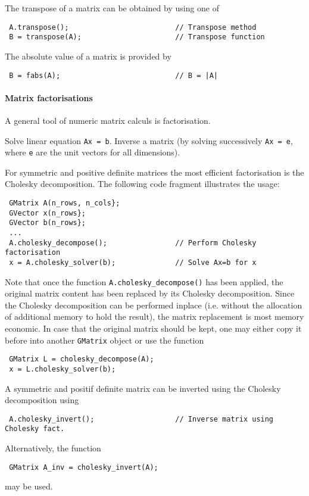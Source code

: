 \documentclass{article}[12pt,a4]
\begin{document}
The transpose of a matrix can be obtained by using one of
\begin{verbatim}
 A.transpose();                         // Transpose method
 B = transpose(A);                      // Transpose function
\end{verbatim}

The absolute value of a matrix is provided by
\begin{verbatim}
 B = fabs(A);                           // B = |A|
\end{verbatim}


\paragraph{Matrix factorisations}

A general tool of numeric matrix calculs is factorisation.

Solve linear equation {\tt Ax = b}.
Inverse a matrix (by solving successively {\tt Ax = e}, where {\tt e} 
are the unit vectors for all dimensions).

For symmetric and positive definite matrices the most efficient 
factorisation is the Cholesky decomposition.
The following code fragment illustrates the usage:
\begin{verbatim}
 GMatrix A(n_rows, n_cols};
 GVector x(n_rows};
 GVector b(n_rows};
 ...
 A.cholesky_decompose();                // Perform Cholesky factorisation
 x = A.cholesky_solver(b);              // Solve Ax=b for x
\end{verbatim}
Note that once the function {\tt A.cholesky\_decompose()} has been 
applied, the original matrix content has been replaced by its Cholesky 
decomposition.
Since the Cholesky decomposition can be performed inplace (i.e. 
without the allocation of additional memory to hold the result), the 
matrix replacement is most memory economic.
In case that the original matrix should be kept, one may either copy 
it before into another {\tt GMatrix} object or use the function
\begin{verbatim}
 GMatrix L = cholesky_decompose(A);
 x = L.cholesky_solver(b);
\end{verbatim}

A symmetric and positif definite matrix can be inverted using the 
Cholesky decomposition using
\begin{verbatim}
 A.cholesky_invert();                   // Inverse matrix using Cholesky fact.
\end{verbatim}
Alternatively, the function 
\begin{verbatim}
 GMatrix A_inv = cholesky_invert(A);
\end{verbatim}
may be used.
\end{document}
